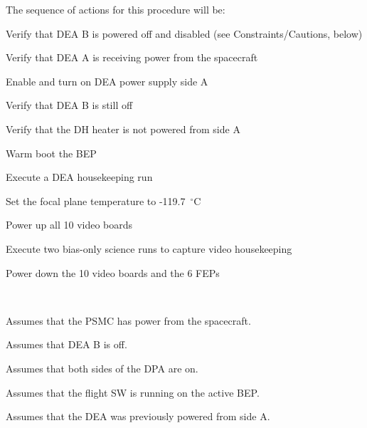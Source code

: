\documentclass[11pt]{article}
\begin{document}
\vspace{0.25in}
\noindent The sequence of actions for this procedure will be:
\be
\item Verify that DEA B is powered off and disabled (see Constraints/Cautions, below)
\vspace{-0.10in}
\item {\color{red} Verify that DEA A is receiving power from the spacecraft}
\vspace{-0.10in}
\item Enable and turn on DEA power supply side A
\vspace{-0.10in}
\item Verify that DEA B is still off
\vspace{-0.10in}
\item Verify that the DH heater is not powered from side A
\vspace{-0.10in}
\item {\color{red} Warm boot the BEP}
\vspace{-0.10in}
\item {\color{red} Execute a DEA housekeeping run}
\vspace{-0.10in}
\item {\color{red} Set the focal plane temperature to -119.7~$^\circ$C}
\vspace{-0.10in}
\item Power up all 10 video boards
\vspace{-0.10in}
\item Execute two bias-only science runs to capture video housekeeping
\vspace{-0.10in}
\item Power down the 10 video boards and the 6 FEPs
\ee

\vspace{0.15in}
\normalsize
{} \\
\normalsize
\be
\item Assumes that the PSMC has power from the spacecraft.
\vspace{-0.10in}
\item Assumes that DEA B is off.
\vspace{-0.10in}
\item Assumes that both sides of the DPA are on.
\vspace{-0.10in}
\item Assumes that the flight SW is running on the active BEP.
\vspace{-0.10in}
\item {\color{red} Assumes that the DEA was previously powered from side A.}
\ee
\vspace{0.1in}
\normalsize
{} \\
\normalsize
\end{document}
